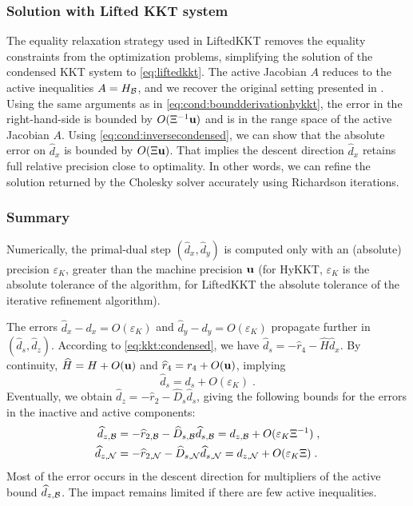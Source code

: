 \subsubsection{Solution with Lifted KKT system}
The equality relaxation strategy used in LiftedKKT
removes the equality constraints from the optimization problems, simplifying
the solution of the condensed KKT system to \eqref{eq:liftedkkt}.
The active Jacobian $A$ reduces to the active inequalities $A = H_{\mathcal{B}}$,
and we recover the original setting presented in \cite{wright1998ill}.
Using the same arguments as in \eqref{eq:cond:boundderivationhykkt},
the error in the right-hand-side is bounded by $O(\Xi^{-1} \mathbf{u})$ and is in the
range space of the active Jacobian $A$. Using \eqref{eq:cond:inversecondensed},
we can show that the absolute error on $\widehat{d}_x$ is bounded by
$O(\Xi \mathbf{u})$. That implies the descent direction $\widehat{d}_x$ retains
full relative precision close to optimality.
In other words, we can refine the solution returned by the Cholesky solver accurately using
Richardson iterations.

\subsubsection{Summary}
Numerically, the primal-dual step $(\widehat{d}_x, \widehat{d}_y)$
is computed only with an (absolute) precision $\varepsilon_{K}$,
greater than the machine precision $\mathbf{u}$ (for HyKKT, $\varepsilon_K$
is the absolute tolerance of the \CG algorithm, for LiftedKKT the
absolute tolerance of the iterative refinement algorithm).

The errors $\widehat{d}_x - d_x = O(\varepsilon_K)$ and
$\widehat{d}_y - d_y = O(\varepsilon_K)$ propagate further in $(\widehat{d}_s, \widehat{d}_z)$.
According to \eqref{eq:kkt:condensed}, we have $\widehat{d}_s = - \widehat{r}_4 - \widehat{H} \widehat{d}_x$.
By continuity, $\widehat{H} = H + O(\mathbf{u})$ and $\widehat{r}_4 = r_4 + O(\mathbf{u})$, implying
\begin{equation}
  \widehat{d}_s = d_s + O(\varepsilon_K) \; .
\end{equation}
Eventually, we obtain $\widehat{d}_z = - \widehat{r}_2 - \widehat{D}_s \widehat{d}_s$,
giving the following bounds for the errors in the inactive and active components:
\begin{equation}
  \begin{aligned}
     \widehat{d}_{z,\mathcal{B}} &= -\widehat{r}_{2,\mathcal{B}} - \widehat{D}_{s,\mathcal{B}} \widehat{d}_{s,\mathcal{B}}
    = d_{z,\mathcal{B}} + O(\varepsilon_K \Xi^{-1}) \;,\\
                              \widehat{d}_{z,\mathcal{N}} &= -\widehat{r}_{2,\mathcal{N}} - \widehat{D}_{s,\mathcal{N}} \widehat{d}_{s,\mathcal{N}}
                               = d_{z,\mathcal{N}} + O(\varepsilon_K \Xi) \; .
  \end{aligned}
\end{equation}
Most of the error occurs in the descent direction for multipliers of the active bound $\widehat{d}_{z,\mathcal{B}}$.
The impact remains limited if there are few active inequalities.


